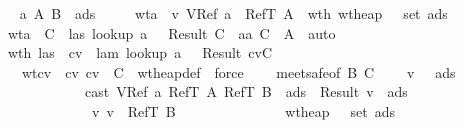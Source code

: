 \begin{isabellebody}
\isamarkupfalse \ {\isacharminus}\isanewline
\ \ \isamarkupfalse \ a\ A\ B\ {\isasymmu}\ ads{}\ {\isasymSigma}\ \isanewline
\ \ \isamarkupfalse \ wta{\isacharcolon}\ {\isachardoublequoteopen}{\isasymSigma}\ {\isasymturnstile}v\ VRef\ a\ {\isacharcolon}\ RefT\ A{\isachardoublequoteclose}\ \ wth{\isacharcolon}\ {\isachardoublequoteopen}wt{\isacharunderscore}heap\ {\isasymSigma}\ {\isasymmu}\ {\isacharparenleft}set\ ads{}{\isacharparenright}{\isachardoublequoteclose}\isanewline
\ \ \isamarkupfalse \ wta\ \isamarkupfalse \ C\ \ las{\isacharcolon}\ {\isachardoublequoteopen}lookup\ a\ {\isasymSigma}\ {\isacharequal}\ Result\ C{\isachardoublequoteclose}\ \ aa{\isacharcolon}\ {\isachardoublequoteopen}C\ {\isasymsqsubseteq}\ A{\isachardoublequoteclose}\ \isamarkupfalse \ auto\isanewline
\ \ \isamarkupfalse \ wth\ las\ \isamarkupfalse \ cv\ \ lam{\isacharcolon}\ {\isachardoublequoteopen}lookup\ a\ {\isasymmu}\ {\isacharequal}\ Result\ {\isacharparenleft}cv{\isacharcomma}C{\isacharparenright}{\isachardoublequoteclose}\isanewline
\ \ \ \ \ wtcv{\isacharcolon}\ {\isachardoublequoteopen}{\isasymSigma}\ {\isasymturnstile}cv\ cv\ {\isacharcolon}\ C{\isachardoublequoteclose}\ \isamarkupfalse \ wt{\isacharunderscore}heap{\isacharunderscore}def\ \isamarkupfalse \ force\ \isamarkupfalse \isanewline
\ \ \isamarkupfalse \ meet{\isacharunderscore}safe{\isacharbrackleft}of\ B\ C{\isacharbrackright}\ \isanewline
\ \ \isamarkupfalse \ {\isachardoublequoteopen}{\isacharparenleft}{\isasymexists}v{\isacharprime}\ {\isasymSigma}{\isacharprime}\ {\isasymmu}{\isacharprime}\ ads{}{\isachardot}\isanewline
\ \ \ \ \ \ \ \ \ \ \ \ \ \ cast\ {\isacharparenleft}VRef\ a{\isacharparenright}\ {\isacharparenleft}RefT\ A{\isacharparenright}\ {\isacharparenleft}RefT\ B{\isacharparenright}\ {\isasymmu}\ ads{}\ {\isacharequal}\ Result\ {\isacharparenleft}v{\isacharprime}{\isacharcomma}\ {\isasymmu}{\isacharprime}{\isacharcomma}\ ads{}{\isacharparenright}\ {\isasymand}\isanewline
\ \ \ \ \ \ \ \ \ \ \ \ \ \ {\isasymSigma}{\isacharprime}\ {\isasymturnstile}v\ v{\isacharprime}\ {\isacharcolon}\ RefT\ B\ {\isasymand}\isanewline
\ \ \ \ \ \ \ \ \ \ \ \ \ \ wt{\isacharunderscore}heap\ {\isasymSigma}{\isacharprime}\ {\isasymmu}{\isacharprime}\ {\isacharparenleft}set\ ads{}{\isacharparenright}\ {\isasymand}\ {\isasymSigma}{\isacharprime}\ {\isasymsqsubseteq}\ {\isasymSigma}{\isacharparenright}\isanewline

\end{isabellebody}
